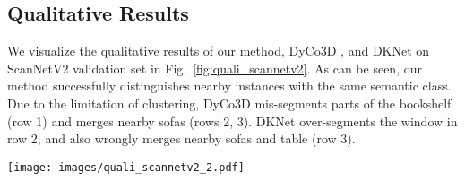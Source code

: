 \documentclass[10pt,twocolumn,letterpaper]{article}
\def\Approach{ISBNet}
\begin{document}



\subsection{Qualitative Results}
We visualize the qualitative results of our method, DyCo3D \cite{he2021dyco3d}, and DKNet \cite{wu2022dknet} on ScanNetV2 validation set in Fig.~\ref{fig:quali_scannetv2}. As can be seen, our method successfully distinguishes nearby instances with the same semantic class. Due to the limitation of clustering, DyCo3D \cite{he2021dyco3d} mis-segments parts of the bookshelf (row 1) and merges nearby sofas (rows 2, 3). DKNet \cite{wu2022dknet} over-segments the window in row 2, and also wrongly merges nearby sofas and table (row 3).


\begin{figure*}[t]
  \centering
  \texttt{[image: images/quali\_scannetv2\_2.pdf]}
\vspace{-8pt}
   \caption{Representative examples on ScanNetV2 validation set. Each row shows an example with the input, Semantic ground truth, and Instance ground truth in the first three columns. Our method (the last column) produces more precise instance masks, especially in regions where multiple instances with the same semantic label lie together.}
\vspace{-10pt}
   \label{fig:quali_scannetv2}
\end{figure*}
\end{document}
